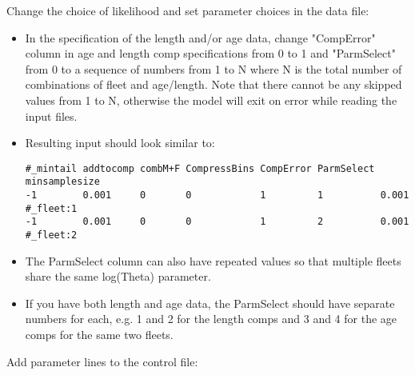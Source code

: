 Change the choice of likelihood and set parameter choices in the data
file: 

\begin{itemize}
\item In the specification of the length and/or age data, change
"CompError" column in age and length comp specifications from 0 to 1 and
"ParmSelect" from 0 to a sequence of numbers from 1 to N where N is the
total number of combinations of fleet and age/length. Note that there
cannot be any skipped values from 1 to N, otherwise the model will exit
on error while reading the input files. 
	
\item Resulting input should look similar to:
\begin{small}
\begin{verbatim}
#_mintail addtocomp combM+F CompressBins CompError ParmSelect minsamplesize   
-1        0.001     0       0            1         1          0.001 #_fleet:1
-1        0.001     0       0            1         2          0.001 #_fleet:2
\end{verbatim}
\end{small}

\item The ParmSelect column can also have repeated values so that
multiple fleets share the same log(Theta) parameter. 
	
\item If you have both length and age data, the ParmSelect should have
separate numbers for each, e.g. 1 and 2 for the length comps and 3 and 4
for the age comps for the same two fleets. 
	
\end{itemize}

Add parameter lines to the control file:


